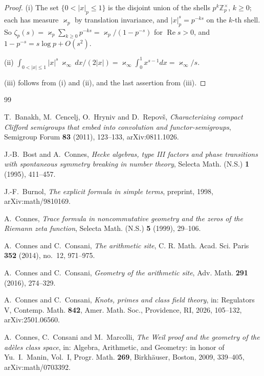 \documentclass[11pt]{amsart}
\theoremstyle{definition}
\newcommand{\Z}{\mathbb Z}
\newcommand{\Rel}{\operatorname{Re}}
\begin{document}
\begin{proof}
(i) The set $\{0<|x|_p\le1\}$ is the disjoint union of the shells
$p^k\Z_p^\times$, $k\ge0$; each has measure $\varkappa_p$ by translation
invariance, and $|x|_p^s=p^{-ks}$ on the $k$-th shell. So
$\zeta_p(s)=\varkappa_p\sum_{k\ge0}p^{-ks}=\varkappa_p/(1-p^{-s})$ for
$\Rel s>0$, and $1-p^{-s}=s\log p+O(s^2)$.

(ii) $\int_{0<|x|\le1}|x|^s\,\varkappa_\infty\,dx/(2|x|)
=\varkappa_\infty\int_0^1x^{s-1}dx=\varkappa_\infty/s$.

(iii) follows from (i) and (ii), and the last assertion from (iii).
\end{proof}

\begin{thebibliography}{99}

T.~Banakh, M.~Cencelj, O.~Hryniv and D.~Repov\v{s}, \emph{Characterizing
compact Clifford semigroups that embed into convolution and
functor-semigroups}, Semigroup Forum \textbf{83} (2011), 123--133,
arXiv:0811.1026.

J.-B.~Bost and A.~Connes, \emph{Hecke algebras, type III factors and phase
transitions with spontaneous symmetry breaking in number theory}, Selecta
Math. (N.S.) \textbf{1} (1995), 411--457.

J.-F.~Burnol, \emph{The explicit formula in simple terms}, preprint, 1998,
arXiv:math/9810169.

A.~Connes, \emph{Trace formula in noncommutative geometry and the zeros of
the Riemann zeta function}, Selecta Math. (N.S.) \textbf{5} (1999), 29--106.

A.~Connes and C.~Consani, \emph{The arithmetic site}, C. R. Math. Acad. Sci.
Paris \textbf{352} (2014), no.~12, 971--975.

A.~Connes and C.~Consani, \emph{Geometry of the arithmetic site}, Adv. Math.
\textbf{291} (2016), 274--329.

A.~Connes and C.~Consani, \emph{Knots, primes and class field theory}, in:
Regulators V, Contemp. Math. \textbf{842}, Amer. Math. Soc., Providence, RI,
2026, 105--132, arXiv:2501.06560.

A.~Connes, C.~Consani and M.~Marcolli, \emph{The Weil proof and the geometry
of the ad\`eles class space}, in: Algebra, Arithmetic, and Geometry: in honor
of Yu.~I.~Manin, Vol.~I, Progr. Math. \textbf{269}, Birkh\"auser, Boston,
2009, 339--405, arXiv:math/0703392.


\end{thebibliography}
\end{document}
